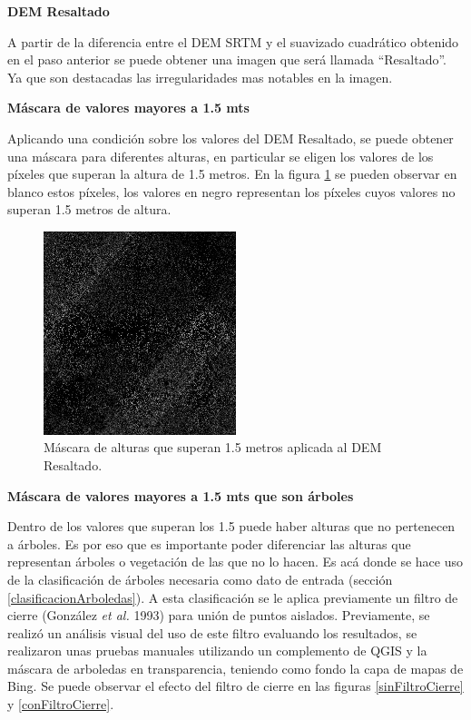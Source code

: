 \documentclass[10pt,a4paper, twoside]{report}
\begin{document}
\textbf{DEM Resaltado}
\label{resta}

A partir de la diferencia entre el DEM SRTM y el suavizado cuadrático obtenido en el paso anterior se puede obtener una imagen que será llamada "`Resaltado"'. Ya que son destacadas las irregularidades mas notables en la imagen.

\textbf{Máscara de valores mayores a 1.5 mts}

Aplicando una condición sobre los valores del DEM Resaltado, se puede obtener una máscara para diferentes alturas, en particular se eligen los valores de los píxeles que superan la altura de 1.5 metros. En la figura \ref{maskTrees} se pueden observar en blanco estos píxeles, los valores en negro representan los píxeles cuyos valores no superan 1.5 metros de altura.

\begin{figure}[H]
   \centering      
   \includegraphics[width=0.5\textwidth]{imagenes/maskTrees.jpg}
 \caption{Máscara de alturas que superan 1.5 metros aplicada al DEM Resaltado.}
 \label{maskTrees}
\end{figure}

\textbf{Máscara de valores mayores a 1.5 mts que son árboles}

Dentro de los valores que superan los 1.5 puede haber alturas que no pertenecen a árboles. Es por eso que es importante poder diferenciar las alturas que representan árboles o vegetación de las que no lo hacen. Es acá donde se hace uso de la clasificación de árboles necesaria como dato de entrada (sección \ref{clasificacionArboledas}). A esta clasificación se le aplica previamente un filtro de cierre (González \textit{et al.} 1993) para unión de puntos aislados.
Previamente, se realizó un análisis visual del uso de este filtro evaluando los resultados, se realizaron unas pruebas manuales utilizando un complemento de QGIS y la máscara de arboledas en transparencia, teniendo como fondo la capa de mapas de Bing. Se puede observar el efecto del filtro de cierre en las figuras \ref{sinFiltroCierre} y \ref{conFiltroCierre}.
\end{document}
